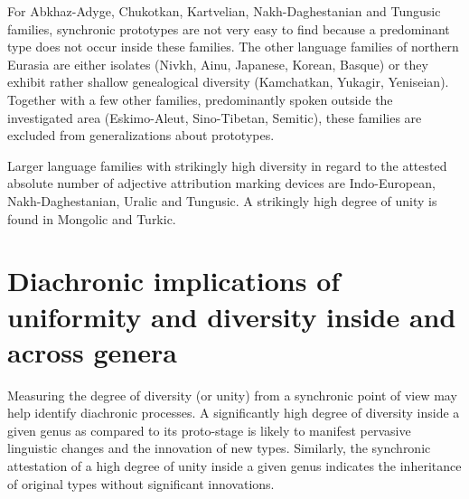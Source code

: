 For Abkhaz-Adyge, Chukotkan, Kartvelian, Nakh-Daghestanian and Tungusic families, synchronic prototypes are not very easy to find because a predominant type does not occur inside these families. The other language families of northern Eurasia are either isolates (Nivkh, Ainu, Japanese, Korean, Basque) or they exhibit rather shallow genealogical diversity (Kamchatkan, Yukagir, Yeniseian). Together with a few other families, predominantly spoken outside the investigated area (Eskimo-Aleut, Sino-Tibetan, Semitic), these families are excluded from generalizations about prototypes. 

Larger language families with strikingly high diversity in regard to the attested absolute number of adjective attribution marking devices are Indo-European, Nakh-Daghestanian, Uralic and Tungusic. A strikingly high degree of unity is found in Mongolic and Turkic.

\section[Diachronic implications]{Diachronic implications of uniformity and diversity inside and across genera}
Measuring the degree of diversity (or unity) from a synchronic point of view may help identify diachronic processes. A significantly high degree of diversity inside a given genus as compared to its proto-stage is likely to manifest pervasive linguistic changes and the innovation of new types. Similarly, the synchronic attestation of a high degree of unity inside a given genus indicates the inheritance of original types without significant innovations. 

